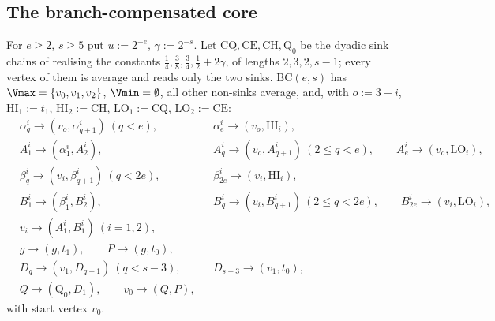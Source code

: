 \subsection{The branch-compensated core}

\begin{definition}[$\mathrm{BC}(e,s)$]\label{ob:bc}
For $e\ge2$, $s\ge5$ put $u:=2^{-e}$, $\gamma:=2^{-s}$. Let
$\mathrm{CQ},\mathrm{CE},\mathrm{CH},\mathrm{Q}_0$ be the dyadic sink
chains of  realising the constants
$\tfrac14,\tfrac38,\tfrac34,\tfrac12+2\gamma$, of lengths $2,3,2,s-1$;
every vertex of them is average and reads only the two sinks.
$\mathrm{BC}(e,s)$ has $\Vmax=\{v_0,v_1,v_2\}$, $\Vmin=\emptyset$, all
other non-sinks average, and, with $o:=3-i$,
$\mathrm{HI}_1:=t_1$, $\mathrm{HI}_2:=\mathrm{CH}$,
$\mathrm{LO}_1:=\mathrm{CQ}$, $\mathrm{LO}_2:=\mathrm{CE}$:
\[
\begin{aligned}
&\alpha^{i}_q\to(v_{o},\alpha^{i}_{q+1})\ (q<e), &&\alpha^{i}_{e}\to(v_{o},\mathrm{HI}_i),\\
&A^{i}_1\to(\alpha^{i}_1,A^{i}_2),&&
A^{i}_q\to(v_{o},A^{i}_{q+1})\ (2\le q<e),\qquad A^{i}_{e}\to(v_{o},\mathrm{LO}_i),\\
&\beta^{i}_q\to(v_{i},\beta^{i}_{q+1})\ (q<2e),&&\beta^{i}_{2e}\to(v_{i},\mathrm{HI}_i),\\
&B^{i}_1\to(\beta^{i}_1,B^{i}_2),&&
B^{i}_q\to(v_{i},B^{i}_{q+1})\ (2\le q<2e),\qquad B^{i}_{2e}\to(v_{i},\mathrm{LO}_i),\\
&v_i\to(A^{i}_1,B^{i}_1)\ (i=1,2),&&\\
&g\to(g,t_1),\qquad P\to(g,t_0),&&\\
&D_q\to(v_1,D_{q+1})\ (q<s-3),&&D_{s-3}\to(v_1,t_0),\\
&Q\to(\mathrm{Q}_0,D_1),\qquad v_0\to(Q,P),&&
\end{aligned}
\]
with start vertex $v_0$.
\end{definition}

